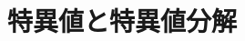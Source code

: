 \documentclass[../../topic_linear-algebra]{subfiles}
\begin{document}
\chapter{特異値と特異値分解}


\end{document}
